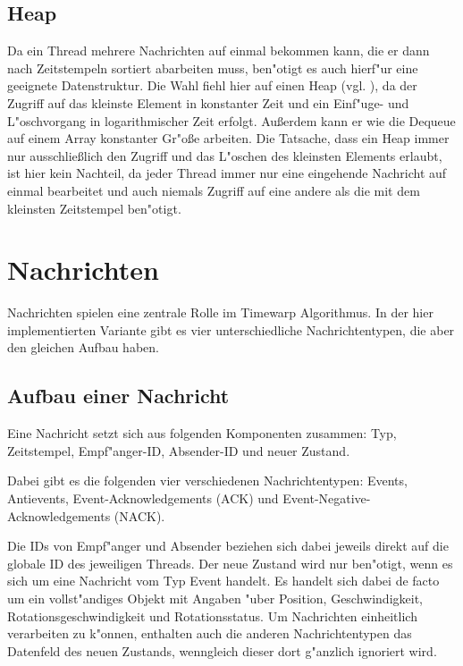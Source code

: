 \documentclass{scrreprt}
\begin{document}
\subsection{Heap}
Da ein Thread mehrere Nachrichten auf einmal bekommen kann, die er dann nach Zeitstempeln sortiert abarbeiten muss,
ben"otigt es auch hierf"ur eine geeignete Datenstruktur. Die Wahl fiehl hier auf einen Heap (vgl. \cite{...}), da der
Zugriff auf das kleinste Element in konstanter Zeit und ein Einf"uge- und L"oschvorgang in logarithmischer Zeit erfolgt.
Au\ss erdem kann er wie die Dequeue auf einem Array konstanter Gr"o\ss e arbeiten.
Die Tatsache, dass ein Heap immer nur ausschlie\ss lich den Zugriff und das L"oschen des kleinsten Elements erlaubt, ist
hier kein Nachteil, da jeder Thread immer nur eine eingehende Nachricht auf einmal bearbeitet und auch niemals Zugriff auf eine
andere als die mit dem kleinsten Zeitstempel ben"otigt.

\section{Nachrichten}
Nachrichten spielen eine zentrale Rolle im Timewarp Algorithmus. In der hier implementierten Variante gibt es vier
unterschiedliche Nachrichtentypen, die aber den gleichen Aufbau haben.
\subsection{Aufbau einer Nachricht}
Eine Nachricht setzt sich aus folgenden Komponenten zusammen: Typ, Zeitstempel, Empf"anger-ID, Absender-ID und neuer
Zustand.

Dabei gibt es die folgenden vier verschiedenen Nachrichtentypen:
Events, Antievents, Event-Acknowledgements (ACK) und Event-Negative-Acknowledgements (NACK).

Die IDs von Empf"anger und Absender beziehen sich dabei jeweils direkt auf die globale ID des jeweiligen Threads. Der
neue Zustand wird nur ben"otigt, wenn es sich um eine Nachricht vom Typ Event handelt. Es handelt sich dabei de facto um
ein vollst"andiges Objekt mit Angaben "uber Position, Geschwindigkeit, Rotationsgeschwindigkeit und Rotationsstatus. Um
Nachrichten einheitlich verarbeiten zu k"onnen, enthalten auch die anderen Nachrichtentypen das Datenfeld des neuen
Zustands, wenngleich dieser dort g"anzlich ignoriert wird.
\end{document}
